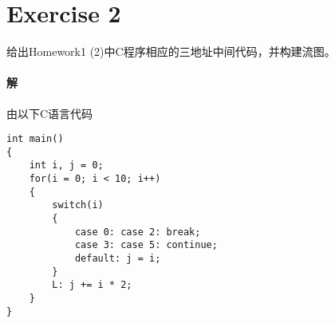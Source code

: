 \documentclass{article}
\begin{document}
\section*{Exercise 2}
给出Homework1 (2)中C程序相应的三地址中间代码，并构建流图。

\paragraph{解}
由以下C语言代码

\begin{lstlisting}[style = C]
int main()
{
    int i, j = 0;
    for(i = 0; i < 10; i++)
    {
        switch(i)
        {
            case 0: case 2: break;
            case 3: case 5: continue;
            default: j = i;
        }
        L: j += i * 2;
    }
}
\end{lstlisting}
\end{document}
